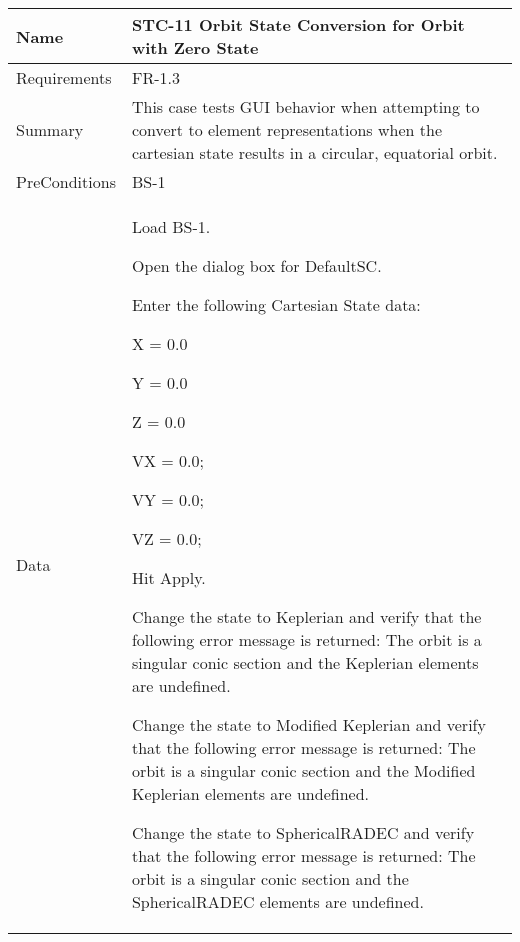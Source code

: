 





\begin{table}[htbp!]
\centering
      \begin{tabular}{|p{1.05 in} |p{4.75 in} |}
      \hline
         \rowcolor[rgb]{0.8,0.8,0.8} Name & STC-11 Orbit State Conversion for Orbit with Zero State\\
         \hline
         Requirements & FR-1.3\\  \hline
         Summary &
         This  case tests GUI behavior when attempting to convert to element representations when the
         cartesian state results in a circular, equatorial orbit.
         \\     \hline
         PreConditions & BS-1\\     \hline
         Data &
         \begin{compactenum}
             \item Load BS-1.
             \item Open the dialog box for DefaultSC.
             \item Enter the following Cartesian State data:
                      \begin{compactenum}
                         \item X = 0.0
                         \item Y = 0.0
                         \item Z = 0.0
                         \item VX = 0.0;
                         \item VY = 0.0;
                         \item VZ = 0.0;
                      \end{compactenum}
             \item Hit Apply.
             \item Change the state to Keplerian and verify that the following error message is returned: The orbit is a singular conic section and the Keplerian elements are undefined.
             \item Change the state to Modified Keplerian and verify that the following error message is returned: The orbit is a singular conic section and the Modified Keplerian elements are undefined.
             \item Change the state to SphericalRADEC and verify that the following error message is returned: The orbit is a singular conic section and the SphericalRADEC elements are undefined.

\end{compactenum}
\end{tabular}
\end{table}
